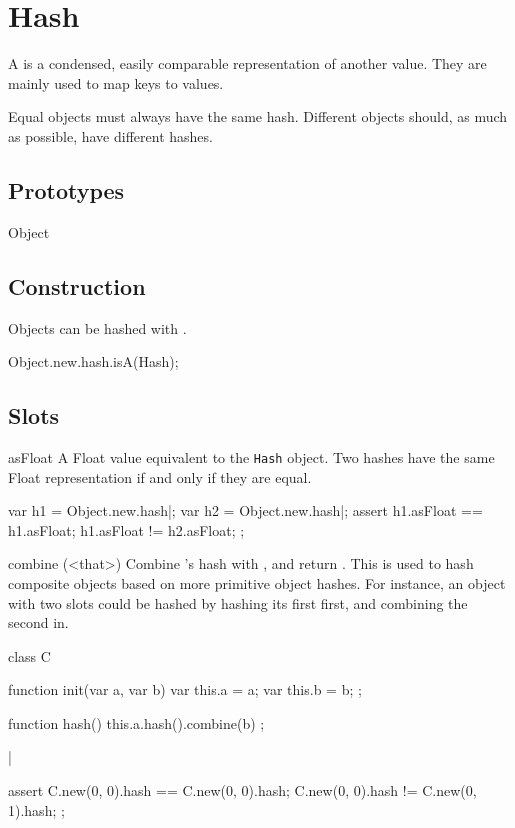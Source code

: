 
\section{Hash}

A  is a condensed, easily comparable representation of another
value. They are mainly used to map  keys to values.

Equal objects must always have the same hash. Different objects should, as
much as possible, have different hashes.

\subsection{Prototypes}
\begin{refObjects}
\item[Object]
\end{refObjects}

\subsection{Construction}
Objects can be hashed with .
\begin{urbiassert}
Object.new.hash.isA(Hash);
\end{urbiassert}

\subsection{Slots}
\begin{urbiscriptapi}
\item[asFloat] A Float value equivalent to the \lstinline|Hash| object. Two
  hashes have the same Float representation if and only if they are equal.
\begin{urbiscript}
var h1 = Object.new.hash|;
var h2 = Object.new.hash|;
assert
{
  h1.asFloat == h1.asFloat;
  h1.asFloat != h2.asFloat;
};
\end{urbiscript}


\item[combine](<that>)%
  Combine \that's hash with \this, and return \this. This is used to hash
  composite objects based on more primitive object hashes. For instance, an
  object with two slots could be hashed by hashing its first first, and
  combining the second in.

\begin{urbiscript}
class C
{
  function init(var a, var b)
  {
    var this.a = a;
    var this.b = b;
  };

  function hash()
  {
    this.a.hash().combine(b)
  };
}|

assert
{
  C.new(0, 0).hash == C.new(0, 0).hash;
  C.new(0, 0).hash != C.new(0, 1).hash;
};
\end{urbiscript}
\end{urbiscriptapi}

